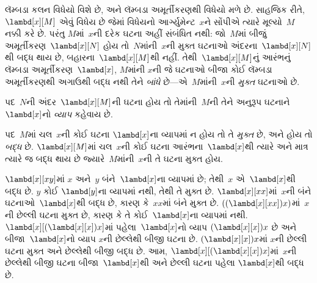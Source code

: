 \documentclass[../../../include/open-logic-section]{subfiles}
\begin{document}

લૅમ્બડા કલન વિધેયો વિશે છે, અને લૅમ્બડા અમૂર્તીકરણથી વિધેયો
મળે છે. સાહજિક રીતે, $\lambd[x][M]$ એવું વિધેય છે જેમાં વિધેયનો
આર્ગ્યુમેન્ટ~$x$ને સોંપીએ ત્યારે મૂલ્યો~$M$ નક્કી કરે છે. પરંતુ
$M$માં~$x$ની દરેક ઘટના અહીં સંબંધિત નથી: જો~$M$માં બીજું
અમૂર્તીકરણ~$\lambd[x][N]$ હોય તો~$N$માંની~$x$ની મુક્ત ઘટનાઓ
અંદરના~$\lambd[x][N]$થી બદ્ધ થાય છે, બહારના~$\lambd[x][M]$થી નહીં.
તેથી~$\lambd[x][M]$નું આરંભનું લૅમ્બડા અમૂર્તીકરણ~$\lambd[x]$, $M$માંની
$x$ની જે ઘટનાઓ બીજા કોઈ લૅમ્બડા અમૂર્તીકરણથી અગાઉથી બદ્ધ નથી
તેને \emph{બાંધે} છે---એ~$M$માંની~$x$ની \emph{મુક્ત} ઘટનાઓ છે.

\begin{defn}[વ્યાપ]
પદ~$N$ની અંદર~$\lambd[x][M]$ની ઘટના હોય તો તેમાંની~$M$ની
તેને અનુરૂપ ઘટનાને~$\lambd[x]$નો \emph{વ્યાપ} કહેવાય છે.
\end{defn}

\begin{defn}[મુક્ત અને બદ્ધ ઘટના]
  પદ~$M$માં ચલ~$x$ની કોઈ ઘટના $\lambd[x]$ના વ્યાપમાં ન હોય તો
  તે \emph{મુક્ત} છે, અને હોય તો \emph{બદ્ધ} છે.
  $\lambd[x][M]$માં ચલ~$x$ની કોઈ ઘટના આરંભના~$\lambd[x]$થી
  ત્યારે અને માત્ર ત્યારે જ બદ્ધ થાય છે જ્યારે~$M$માંની~$x$ની
  તે ઘટના મુક્ત હોય.
\end{defn}

\begin{ex}
  $\lambd[x][x y]$માં $x$ અને~$y$ બંને~$\lambd[x]$ના વ્યાપમાં
  છે; તેથી~$x$ એ~$\lambd[x]$થી બદ્ધ છે. $y$ કોઈ
  $\lambd[y]$ના વ્યાપમાં નથી, તેથી તે મુક્ત છે.
  $\lambd[x][x x]$માં~$x$ની બંને ઘટનાઓ~$\lambd[x]$થી બદ્ધ છે,
  કારણ કે~$xx$માં બંને મુક્ત છે.
  $((\lambd[x][xx])x)$માં~$x$ની છેલ્લી ઘટના મુક્ત છે, કારણ કે
  તે કોઈ~$\lambd[x]$ના વ્યાપમાં નથી.
  $\lambd[x][(\lambd[x][x])x]$માં પહેલા~$\lambd[x]$નો વ્યાપ
  $(\lambd[x][x])x$ છે અને બીજા~$\lambd[x]$નો વ્યાપ
  $x$ની છેલ્લેથી બીજી ઘટના છે. $(\lambd[x][x])x$માં
  $x$ની છેલ્લી ઘટના મુક્ત અને છેલ્લેથી બીજી બદ્ધ છે.
  આમ, $\lambd[x][(\lambd[x][x])x]$માં~$x$ની છેલ્લેથી બીજી
  ઘટના બીજા~$\lambd[x]$થી અને છેલ્લી ઘટના પહેલા
  $\lambd[x]$થી બદ્ધ છે.
\end{ex}
\end{document}
